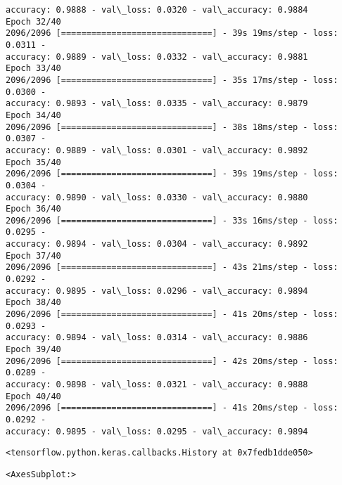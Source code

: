 \documentclass[11pt]{article}
\makeatletter
\newcommand{\boxspacing}{\kern\kvtcb@left@rule\kern\kvtcb@boxsep}
\newcommand{\prompt}[4]{
        {\ttfamily\llap{{\color{#2}[#3]:\hspace{3pt}#4}}\vspace{-\baselineskip}}
    }
\makeatother
\begin{document}
\begin{Verbatim}[commandchars=\\\{\}]
accuracy: 0.9888 - val\_loss: 0.0320 - val\_accuracy: 0.9884
Epoch 32/40
2096/2096 [==============================] - 39s 19ms/step - loss: 0.0311 -
accuracy: 0.9889 - val\_loss: 0.0332 - val\_accuracy: 0.9881
Epoch 33/40
2096/2096 [==============================] - 35s 17ms/step - loss: 0.0300 -
accuracy: 0.9893 - val\_loss: 0.0335 - val\_accuracy: 0.9879
Epoch 34/40
2096/2096 [==============================] - 38s 18ms/step - loss: 0.0307 -
accuracy: 0.9889 - val\_loss: 0.0301 - val\_accuracy: 0.9892
Epoch 35/40
2096/2096 [==============================] - 39s 19ms/step - loss: 0.0304 -
accuracy: 0.9890 - val\_loss: 0.0330 - val\_accuracy: 0.9880
Epoch 36/40
2096/2096 [==============================] - 33s 16ms/step - loss: 0.0295 -
accuracy: 0.9894 - val\_loss: 0.0304 - val\_accuracy: 0.9892
Epoch 37/40
2096/2096 [==============================] - 43s 21ms/step - loss: 0.0292 -
accuracy: 0.9895 - val\_loss: 0.0296 - val\_accuracy: 0.9894
Epoch 38/40
2096/2096 [==============================] - 41s 20ms/step - loss: 0.0293 -
accuracy: 0.9894 - val\_loss: 0.0314 - val\_accuracy: 0.9886
Epoch 39/40
2096/2096 [==============================] - 42s 20ms/step - loss: 0.0289 -
accuracy: 0.9898 - val\_loss: 0.0321 - val\_accuracy: 0.9888
Epoch 40/40
2096/2096 [==============================] - 41s 20ms/step - loss: 0.0292 -
accuracy: 0.9895 - val\_loss: 0.0295 - val\_accuracy: 0.9894
    \end{Verbatim}

            \begin{tcolorbox}[breakable, size=fbox, boxrule=.5pt, pad at break*=1mm, opacityfill=0]
\prompt{Out}{outcolor}{69}{\boxspacing}
\begin{Verbatim}[commandchars=\\\{\}]
<tensorflow.python.keras.callbacks.History at 0x7fedb1dde050>
\end{Verbatim}
\end{tcolorbox}
        
            \begin{tcolorbox}[breakable, size=fbox, boxrule=.5pt, pad at break*=1mm, opacityfill=0]
\prompt{Out}{outcolor}{71}{\boxspacing}
\begin{Verbatim}[commandchars=\\\{\}]
<AxesSubplot:>
\end{Verbatim}
\end{tcolorbox}
        
    \begin{center}
    \end{center}
    { \hspace*{\fill} \\}
    
\end{document}
